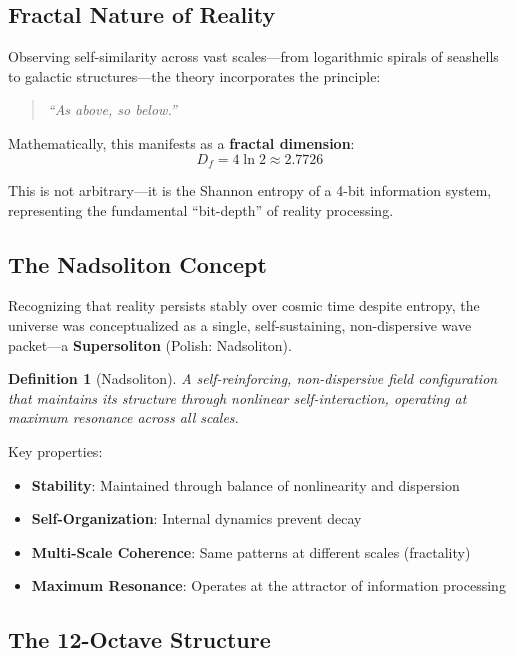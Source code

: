\documentclass[11pt, a4paper]{article}
\newtheorem{definition}{Definition}[section]
\theoremstyle{remark}
\begin{document}
\subsection{Fractal Nature of Reality}

Observing self-similarity across vast scales—from logarithmic spirals of seashells to galactic structures—the theory incorporates the principle:

\begin{quote}
\textit{``As above, so below.''}
\end{quote}

Mathematically, this manifests as a \textbf{fractal dimension}:
\begin{equation}
D_f = 4 \ln 2 \approx 2.7726
\label{eq:fractal_dimension}
\end{equation}

This is not arbitrary—it is the Shannon entropy of a 4-bit information system, representing the fundamental ``bit-depth'' of reality processing.

\subsection{The Nadsoliton Concept}

Recognizing that reality persists stably over cosmic time despite entropy, the universe was conceptualized as a single, self-sustaining, non-dispersive wave packet—a \textbf{Supersoliton} (Polish: Nadsoliton).

\begin{definition}[Nadsoliton]
A self-reinforcing, non-dispersive field configuration that maintains its structure through nonlinear self-interaction, operating at maximum resonance across all scales.
\end{definition}

Key properties:
\begin{itemize}
    \item \textbf{Stability}: Maintained through balance of nonlinearity and dispersion
    \item \textbf{Self-Organization}: Internal dynamics prevent decay
    \item \textbf{Multi-Scale Coherence}: Same patterns at different scales (fractality)
    \item \textbf{Maximum Resonance}: Operates at the attractor of information processing
\end{itemize}

\subsection{The 12-Octave Structure}
\end{document}
